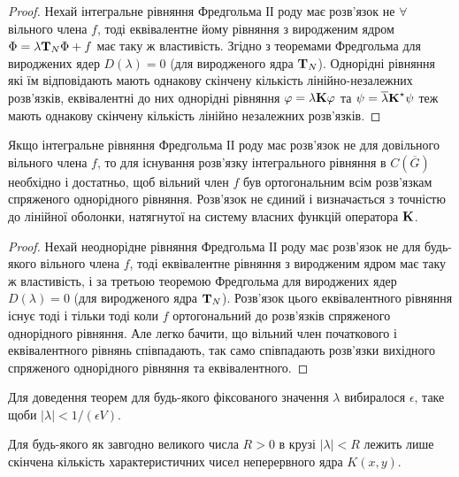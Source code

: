 \begin{proof}
	Нехай інтегральне рівняння Фредгольма ІІ роду має розв'язок не $\forall$ вільного члена $f$, тоді еквівалентне йому рівняння з виродженим ядром $\Phi = \lambda \bf{T}_N \Phi + f$  має таку ж властивість. Згідно з теоремами Фредгольма для вироджених ядер $D(\lambda) = 0$ (для виродженого ядра $\bf{T}_N$). Однорідні рівняння які їм відповідають мають однакову скінчену кількість лінійно-незалежних розв'язків, еквівалентні до них однорідні рівняння  $\phi = \lambda \bf{K} \phi$ та $\psi = \overline \lambda \bf{K}^\star \psi$ теж мають однакову скінчену кількість лінійно незалежних розв'язків.
\end{proof}

\begin{theorem}
	Якщо інтегральне рівняння Фредгольма ІІ роду має розв'язок не для довільного вільного члена $f$, то для існування розв'язку інтегрального рівняння в $C\left(\overline G\right)$ необхідно і достатньо, щоб вільний член $f$ був ортогональним всім розв'язкам спряженого однорідного рівняння. Розв'язок не єдиний і визначається з точністю до лінійної оболонки, натягнутої на систему власних функцій оператора $\bf{K}$.
\end{theorem}

\begin{proof}
	Нехай неоднорідне рівняння Фредгольма ІІ роду має розв'язок не для будь-якого вільного члена $f$, тоді еквівалентне рівняння з виродженим ядром має таку ж властивість, і за третьою теоремою Фредгольма для вироджених ядер $D(\lambda) = 0$ (для виродженого ядра $\bf{T}_N$). Розв'язок цього еквівалентного рівняння існує тоді і тільки тоді коли $f$ ортогональний до розв'язків спряженого однорідного рівняння. Але легко бачити, що вільний член початкового і еквівалентного рівнянь співпадають, так само співпадають розв'язки вихідного спряженого однорідного рівняння та еквівалентного.
\end{proof}

\begin{remark}
	Для доведення теорем для будь-якого фіксованого значення $\lambda$ вибиралося $\epsilon$, таке щоби $|\lambda| < 1 / (\epsilon V)$.
\end{remark}

\begin{theorem}
	Для будь-якого як завгодно великого числа $R > 0$ в крузі $|\lambda| < R$ лежить лише скінчена кількість характеристичних чисел неперервного ядра $K(x, y)$.
\end{theorem}

